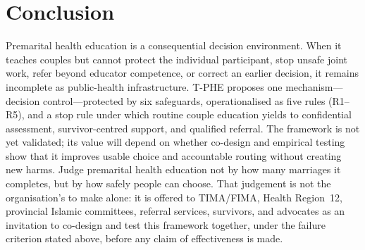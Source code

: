 \documentclass[10pt,twocolumn]{article}
\newcommand{\tphe}{T\mbox{-}PHE}
\begin{document}
\section{Conclusion}
Premarital health education is a consequential decision environment. When it teaches couples but cannot protect the individual participant, stop unsafe joint work, refer beyond educator competence, or correct an earlier decision, it remains incomplete as public-health infrastructure. \tphe{} proposes one mechanism---decision control---protected by six safeguards, operationalised as five rules (R1--R5), and a stop rule under which routine couple education yields to confidential assessment, survivor-centred support, and qualified referral. The framework is not yet validated; its value will depend on whether co-design and empirical testing show that it improves usable choice and accountable routing without creating new harms. Judge premarital health education not by how many marriages it completes, but by how safely people can choose. That judgement is not the organisation's to make alone: it is offered to TIMA/FIMA, Health Region~12, provincial Islamic committees, referral services, survivors, and advocates as an invitation to co-design and test this framework together, under the failure criterion stated above, before any claim of effectiveness is made.
\end{document}
